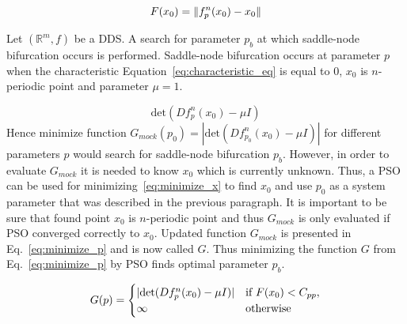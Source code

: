 \begin{equation}
\label{eq:minimize_x}
    F(x_0) = \lVert f^{n}_{p}(x_0)-x_0\rVert
\end{equation}

\par
Let $(\mathbb{R}^{m}, f)$ be a DDS.
A search for parameter $p_b$ at which saddle-node bifurcation occurs is performed.
Saddle-node bifurcation occurs at parameter $p$ when the characteristic Equation~\ref{eq:characteristic_eq} is equal to $0$, $x_0$ is $n$-periodic point and parameter $\mu = 1$.

\begin{equation}
\label{eq:characteristic_eq}
        \text{det}(Df^{n}_{p}(x_0)-\mu I)
\end{equation}
Hence minimize function $G_{mock}(p_0) = |\text{det}(Df^{n}_{p_0}(x_0)-\mu I)|$ for different parameters $p$ would search for saddle-node bifurcation $p_b$.
However, in order to evaluate $G_{mock}$ it is needed to know $x_0$ which is currently unknown.
Thus, a PSO can be used for minimizing~\ref{eq:minimize_x} to find $x_0$ and use $p_0$ as a system parameter that was described in the previous paragraph.
It is important to be sure that found point $x_0$ is $n$-periodic point and thus $G_{mock}$ is only evaluated if PSO converged correctly to $x_0$.
Updated function $G_{mock}$ is presented in Eq.~\ref{eq:minimize_p} and is now called $G$.
Thus minimizing the function $G$ from Eq.~\ref{eq:minimize_p} by PSO finds optimal parameter $p_b$.

\begin{equation}
\label{eq:minimize_p}
    G(p) =
    \begin{cases}
        |\text{det}(Df^{n}_{p}(x_0)-\mu I)| & \text{if } F(x_0) < C_{pp}, \\
        \infty & \rm{otherwise}
    \end{cases}
\end{equation}

